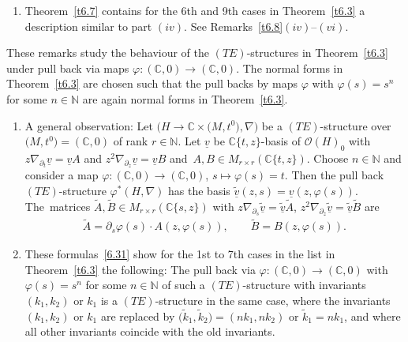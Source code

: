 \documentclass[pdftex]{sigma}%
\numberwithin{equation}{section}
\numberwithin{figure}{section}
\newcommand{\N}{{\mathbb N}}
\newcommand{\C}{{\mathbb C}}
\newcommand{\OO}{{\mathcal O}}
\newcommand{\www}{\widetilde}
\newcommand{\uuuu}{\underline}
\newcommand{\paa}{\partial}
\newcommand{\nnn}{\nabla}
\begin{document}
\begin{Remarks}
\begin{enumerate}
{}

\item[$(v)$] Theorem~\ref{t6.7} contains for the 6th and 9th cases
in Theorem~\ref{t6.3} a description similar to part $(iv)$.
See Remarks~\ref{t6.8}$(iv)$--$(vi)$.
\end{enumerate}
\end{Remarks}


\begin{Remarks}\label{t6.5}
These remarks study the behaviour of the $(TE)$-structures
in Theorem~\ref{t6.3} under pull back via maps
$\varphi\colon (\C,0)\to(\C,0)$.
The normal forms in Theorem~\ref{t6.3}
are chosen such that the pull backs
by maps $\varphi$ with
$\varphi(s)=s^n$ for some $n\in\N$
are again normal forms in Theorem~\ref{t6.3}.

\begin{enumerate}\itemsep=0pt
\item[$(i)$] A general observation:
Let $\big(H\to\C\times \big(M,t^0\big),\nnn\big)$ be a $(TE)$-structure
over $\big(M,t^0\big)=(\C,0)$ of rank $r\in\N$.
Let $\uuuu{v}$ be $\C\{t,z\}$-basis
of $\OO(H)_0$ with $z\nnn_{\paa_t}\uuuu{v}=\uuuu{v}A$
and $z^2\nnn_{\paa_z}\uuuu{v}=\uuuu{v}B$ and~$A,B\in M_{r\times r}(\C\{t,z\})$.
Choose $n\in\N$ and consider a map
$\varphi\colon (\C,0)\to(\C,0)$, $s\mapsto \varphi(s)=t$.
Then the pull back $(TE)$-structure $\varphi^*(H,\nnn)$
has the basis $\uuuu{\www v}(z,s)=\uuuu{v}(z,\varphi(s))$.
The~matrices $\www A,\www B\in M_{r\times r}(\C\{s,z\})$
with $z\nnn_{\paa_s}\uuuu{\www v}=\uuuu{\www v}\www A$,
$z^2\nnn_{\paa_z}\uuuu{\www v}=\uuuu{\www v}\www B$ are
\begin{gather}\label{6.31}
\www A=\paa_s\varphi(s)\cdot A(z,\varphi(s)),\qquad
\www B=B(z,\varphi(s)).
\end{gather}

\item[$(ii)$] These formulas~\eqref{6.31} show for the 1st to 7th
cases in the list in Theorem~\ref{t6.3} the following:
The pull back via $\varphi\colon (\C,0)\to(\C,0)$ with
$\varphi(s)=s^n$ for some $n\in\N$
of such a $(TE)$-structure with invariants $(k_1,k_2)$
or $k_1$
is a $(TE)$-structure in the same case, where the invariants
$(k_1,k_2)$ or $k_1$ are replaced by $\big(\www k_1,\www k_2\big)=(nk_1,nk_2)$
or $\www{k}_1=nk_1$,
and where all other invariants coincide with the old invariants.


\end{enumerate}
\end{Remarks}
\end{document}
